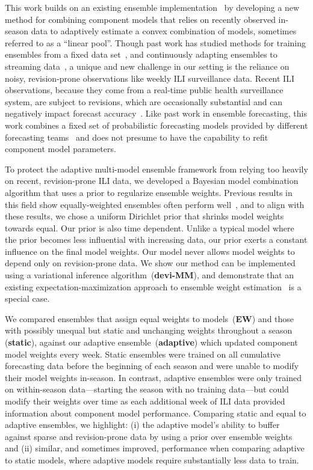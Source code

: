 \documentclass[sagev,times,Review,10pt]{sagej}
\begin{document}
This work builds on an existing ensemble implementation~\cite{reich2019collaborative} by developing a new method for combining component models that relies on recently observed in-season data to adaptively estimate a convex combination of models, sometimes referred to as a ``linear pool''.
Though past work has studied methods for training ensembles from a fixed data set~\cite{gneiting2005weather,foley2012current,van2007super}, and continuously adapting ensembles to streaming data~\cite{pari2018multi,fern2003online,benkeser2018online},
a unique and new challenge in our setting is the reliance on noisy, revision-prone observations like weekly ILI surveillance data.
Recent ILI observations, because they come from a real-time public health surveillance system, are subject to revisions, which are occasionally substantial and can negatively impact forecast accuracy~\cite{osthus2019even,reich2019collaborativepnas}.
Like past work in ensemble forecasting, this work combines a fixed set of probabilistic forecasting models provided by different forecasting teams~\cite{reich2019collaborativepnas} and does not presume to have the capability to refit  component model parameters.

To protect the adaptive multi-model ensemble framework from relying too heavily on recent, revision-prone ILI data, we developed a Bayesian model combination algorithm that uses a prior to regularize ensemble weights.
Previous results in this field show equally-weighted ensembles often perform well~\cite{mcgowan2019collaborative,reich2019collaborative}, and to align with these results, we chose a uniform Dirichlet prior that shrinks model weights towards equal.
Our prior is also time dependent. 
Unlike a typical model where the prior becomes less influential with increasing data, our prior exerts a constant influence on the final model weights. 
Our model never allows model weights to depend only on revision-prone data.
We show our method can be implemented using a variational inference algorithm~(\textbf{devi-MM}), and demonstrate that an existing expectation-maximization approach to ensemble weight estimation~\cite{reich2019collaborative} is a special case.

We compared ensembles that assign equal weights to models~(\textbf{EW}) and those with possibly unequal but static and unchanging weights throughout a season (\textbf{static}),  against our adaptive ensemble~(\textbf{adaptive}) which updated component model weights every week.
Static ensembles were trained on all cumulative forecasting data before the beginning of each season and were unable to modify their model weights in-season.
In contrast, adaptive ensembles were only trained on within-season data---starting the season with no training data---but could modify their weights over time as each additional week of ILI data provided information about  component model performance.
Comparing static and equal to adaptive ensembles, we highlight: (i) the adaptive model's ability to buffer against sparse and revision-prone data by using a prior over ensemble weights and (ii) similar, and sometimes improved, performance when comparing adaptive to static models, where adaptive models require substantially less data to train.
\end{document}
